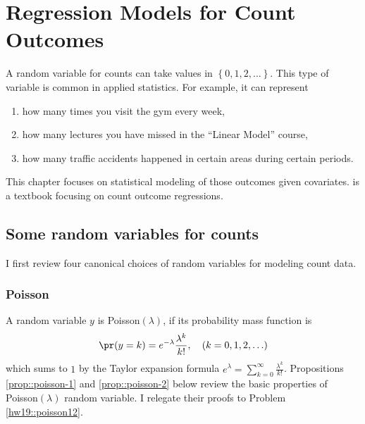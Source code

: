  
\chapter{Regression Models for Count Outcomes}
\label{chapter::count}
 
A random variable for counts can take values in $\left\{ 0,1,2,\ldots\right\} $. This type of variable is common in applied statistics. For example, it can represent 
\begin{enumerate}[label=(E\arabic*), ref=E\arabic*]
\item
how many times you visit the gym every week,
\item
how many lectures you have missed in the ``Linear Model'' course,
\item
how many traffic accidents happened in certain areas during certain periods. 
\end{enumerate}
This chapter focuses on statistical modeling of those outcomes given covariates. \citet{hilbe2014modeling} is a textbook focusing on count outcome regressions. 




\section{Some random variables for counts\label{sec:Some-random-variables-counts}}


I first review four canonical choices of random variables for modeling count data.

\subsection{Poisson}

A random variable $y$ is Poisson$(\lambda)$, if its probability mass
function is
\[
\pr(y=k)=e^{-\lambda}\frac{\lambda^{k}}{k!}, \quad(k=0,1,2,\ldots)
\]
which sums to $1$ by the Taylor expansion formula $e^{\lambda} =  \sum_{k=0}^{\infty}  \frac{\lambda^{k}}{k!}$.
Propositions \ref{prop::poisson-1} and \ref{prop::poisson-2} below review the basic properties of Poisson$(\lambda)$ random variable. I relegate their proofs to Problem \ref{hw19::poisson12}. 



